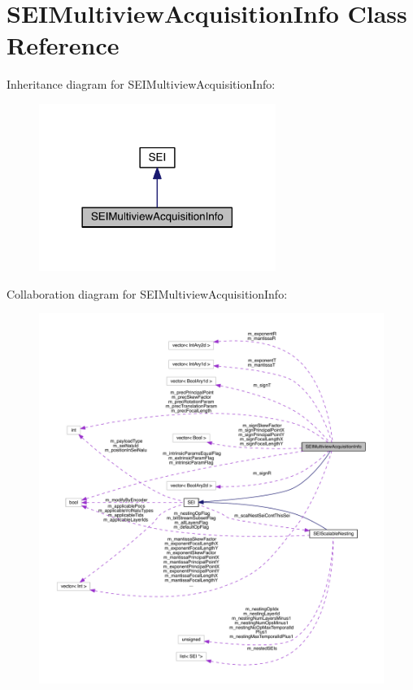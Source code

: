 \hypertarget{class_s_e_i_multiview_acquisition_info}{}\section{S\+E\+I\+Multiview\+Acquisition\+Info Class Reference}
\label{class_s_e_i_multiview_acquisition_info}


Inheritance diagram for S\+E\+I\+Multiview\+Acquisition\+Info\+:
\nopagebreak
\begin{figure}[H]
\begin{center}
\leavevmode
\includegraphics[width=218pt]{d2/d98/class_s_e_i_multiview_acquisition_info__inherit__graph}
\end{center}
\end{figure}


Collaboration diagram for S\+E\+I\+Multiview\+Acquisition\+Info\+:
\nopagebreak
\begin{figure}[H]
\begin{center}
\leavevmode
\includegraphics[width=350pt]{d3/d41/class_s_e_i_multiview_acquisition_info__coll__graph}
\end{center}
\end{figure}
